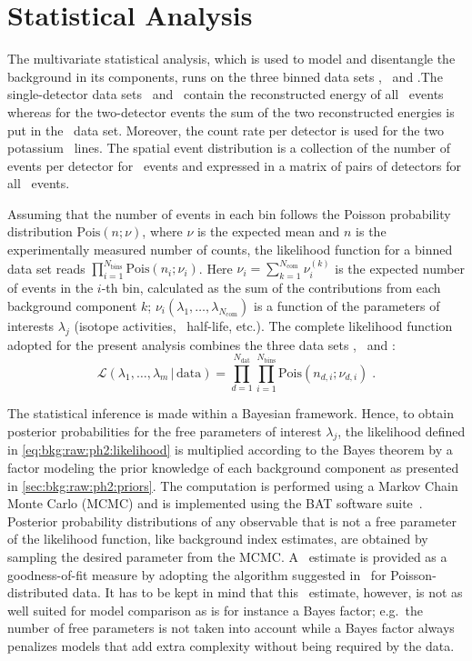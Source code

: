 \section{Statistical Analysis}%
\label{sec:bkg:raw:ph2:stat}

The multivariate statistical analysis, which is used to model and disentangle the
background in its components, runs on the three binned data sets \enrBEGeII, \enrCoaxII\
and \enrGeII.The single-detector data sets \enrBEGeII\ and \enrCoaxII\ contain the
reconstructed energy of all \Mone\ events whereas for the two-detector events the sum of
the two reconstructed energies is put in the \enrGeII\ data set. Moreover, the count rate
per detector is used for the two potassium \g\ lines.  The spatial event distribution is a
collection of the number of events per detector for \Mone\ events and expressed in a
matrix of pairs of detectors for all \Mtwo\ events.

Assuming that the number of events in each bin follows the Poisson probability
distribution $\text{Pois}(n;\nu)$, where $\nu$ is the expected mean and $n$ is the
experimentally measured number of counts, the likelihood function for a binned data set
reads $\prod_{i=1}^{N_\text{bins}} \text{Pois}(n_i;\nu_i)$. Here $\nu_i =
\sum_{k=1}^{N_\text{com}} \nu_i^{(k)}$ is the expected number of events in the $i$-th bin,
calculated as the sum of the contributions from each background component $k$;
$\nu_i(\lambda_1, \ldots, \lambda_{N_\text{com}})$ is a function of the parameters of
interests $\lambda_j$ (isotope activities, \nnbb\ half-life, etc.). The complete
likelihood function adopted for the present analysis combines the three data sets
\enrBEGeII, \enrCoaxII\ and \enrGeII:
\begin{equation}\label{eq:bkg:raw:ph2:likelihood}
  \mathcal{L}(\lambda_1, \ldots, \lambda_m \,|\, \text{data}) =
    \prod_{d=1}^{N_\text{dat}}
    \prod_{i=1}^{N_\text{bins}}
    \text{Pois}(n_{d,i};\nu_{d,i})\;.
\end{equation}

The statistical inference is made within a Bayesian framework. Hence, to obtain posterior
probabilities for the free parameters of interest $\lambda_j$, the likelihood defined in
\cref{eq:bkg:raw:ph2:likelihood} is multiplied according to the Bayes theorem by a factor
modeling the prior knowledge of each background component as presented in
\cref{sec:bkg:raw:ph2:priors}. The computation is performed using a Markov Chain Monte
Carlo (MCMC) and is implemented using the BAT software suite~\cite{Caldwell2008,
Beaujean2018}. Posterior probability distributions of any observable that is not a free
parameter of the likelihood function, like background index estimates, are obtained by
sampling the desired parameter from the MCMC. A \pvalue\ estimate is provided as a
goodness-of-fit measure by adopting the algorithm suggested in~\cite{Beaujean2011} for
Poisson-distributed data.  It has to be kept in mind that this \pvalue\ estimate, however,
is not as well suited for model comparison as is for instance a Bayes factor; e.g.~the
number of free parameters is not taken into account while a Bayes factor always penalizes
models that add extra complexity without being required by the data.

